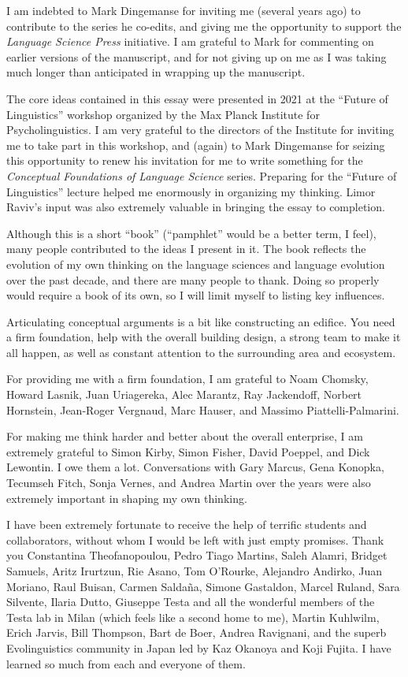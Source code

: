 \addchap{\lsAcknowledgementTitle} 

I am indebted to Mark Dingemanse for inviting me (several years ago) to contribute to the series he co-edits, and giving me the opportunity to support the \textit{Language Science Press} initiative. I am grateful to Mark for commenting on earlier versions of the manuscript, and for not giving up on me as I was taking much longer than anticipated in wrapping up the manuscript. 

The core ideas contained in this essay were presented in 2021 at the ``Future of Linguistics'' workshop organized by the Max Planck Institute for Psycholinguistics. I am very grateful to the directors of the Institute for inviting me to take part in this workshop, and (again) to Mark Dingemanse for seizing this opportunity to renew his invitation for me to write something for the \textit{Conceptual Foundations of Language Science} series. Preparing for the ``Future of Linguistics'' lecture helped me enormously in organizing my thinking. Limor Raviv's input was also extremely valuable in bringing the essay to completion.

Although this is a short ``book'' (``pamphlet'' would be a better term, I feel), many people contributed to the ideas I present in it. The book reflects the evolution of my own thinking on the language sciences and language evolution over the past decade, and there are many people to thank. Doing so properly would require a book of its own, so I will limit myself to listing key influences.

Articulating conceptual arguments is a bit like constructing an edifice. You need a firm foundation, help with the overall building design, a strong team to make it all happen, as well as constant attention to the surrounding area and ecosystem.

For providing me with a firm foundation, I am grateful to Noam Chomsky, Howard Lasnik, Juan Uriagereka, Alec Marantz, Ray Jackendoff, Norbert Hornstein, Jean-Roger Vergnaud, Marc Hauser, and Massimo Piattelli-Palmarini. 

For making me think harder and better about the overall enterprise, I am extremely grateful to Simon Kirby, Simon Fisher, David Poeppel, and Dick Lewontin. I owe them a lot. Conversations with Gary Marcus, Gena Konopka, Tecumseh Fitch, Sonja Vernes, and Andrea Martin over the years were also extremely important in shaping my own thinking.

I have been extremely fortunate to receive the help of terrific students and collaborators, without whom I would be left with just empty promises. Thank you Constantina Theofanopoulou, Pedro Tiago Martins, Saleh Alamri, Bridget Samuels, Aritz Irurtzun, Rie Asano, Tom O'Rourke, Alejandro Andirko, Juan Moriano, Raul Buisan, Carmen Salda\~{n}a, Simone Gastaldon, Marcel Ruland, Sara Silvente, Ilaria Dutto, Giuseppe Testa and all the wonderful members of the Testa lab in Milan (which feels like a second home to me), Martin Kuhlwilm, Erich Jarvis, Bill Thompson, Bart de Boer, Andrea Ravignani, and the superb Evolinguistics community in Japan led by Kaz Okanoya and Koji Fujita. I have learned so much from each and everyone of them. 

